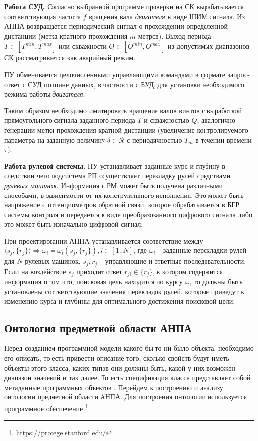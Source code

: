 \textbf{Работа СУД.}
Согласно выбранной программе проверки на СК вырабатывается соответствующая 
частота $f$ вращения вала \textit{двигателя} в виде ШИМ сигнала.
Из АНПА возвращается периодический сигнал о прохождении определенной дистанции (метка кратного прохождения $m$ метров).
Выход периода $T \in [T^{min}, T^{max}]$ или скважности $Q \in [Q^{min}, Q^{max}]$ из допустимых диапазонов
СК рассматривается как аварийный режим.

ПУ обменивается целочисленными управляющими командами в формате запрос-ответ с СУД по шине данных, в частности с БУД,
для установки необходимого режима работы \textit{двигателя}.

Таким образом необходимо имитировать вращение валов винтов с выработкой прямоугольного сигнала заданного периода $T$ и скважностью $Q$,
аналогично -- генерации метки прохождения кратной дистанции
(увеличение контролируемого параметра на заданную величину $\delta \in \mathcal{R}$ с периодичностью $T_m$ в течении времени $\tau$).

\textbf{Работа рулевой системы.}
ПУ устанавливает заданные курс и глубину в следствии чего подсистема РП
осуществляет перекладку рулей средствами \textit{рулевых машинок}.
Информация с РМ может быть получена различными способами, в зависимости от их конструктивного исполнения.
Это может быть напряжение с потенциометров обратной связи, которое обрабатывается в БГР системы контроля
и передается в виде преобразованного цифрового сигнала
либо это может быть изначально  цифровой сигнал.

При проектировании АНПА устанавливается соответствие между $\langle s_j, \{r_j\} \rangle \Rightarrow \omega_i = \omega_i(s_j, \{r_j\}), i\in [1..N]$,
где $\omega_i$ -- заданные перекладки рулей для $N$ рулевых машинок,
$s_j, r_j$ -- управляющие и ответные последовательности.
Если на воздействие $s_j$ приходит ответ $r_{ji} \in \{r_j\}$, в котором содержится информация о том что,
поисковая цель находится по курсу $\bar \omega$, то должны быть установлены соответствующие значения перекладок рулей,
которые приведут к изменению курса и глубины для оптимального достижения поисковой цели.



\subsection{Онтология предметной области АНПА}

Перед созданием программной модели какого бы то ни было объекта, необходимо его описать,
то есть привести описание того, сколько свойств будут иметь объекты этого класса,
каких типов они должны быть, какой у них возможен диапазон значений и так далее.
То есть спецификация класса представляет собой \underline{метаданные} программных объектов \cite{journal:vestnik_spbgu:ivakin}.
Перейдем к построению и анализу онтологии предметной области АНПА.
Для построения онтологии используется программное обеспечение
\protege\footnote{\url{https://protege.stanford.edu/}}.

